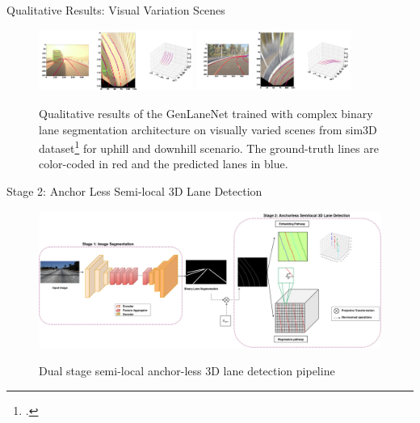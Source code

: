 \documentclass[aspectratio=169]{beamer}
\begin{document}
\begin{frame}{Qualitative Results: Visual Variation Scenes}
    \begin{figure}[h]
      \caption{Qualitative results of the  GenLaneNet trained with complex binary lane segmentation architecture on visually varied scenes from sim3D dataset\footcite{guo2020gen} for uphill and downhill scenario. The ground-truth lines are color-coded in red and the predicted lanes in blue.}
        \centering
        \includegraphics[width= 0.45\textwidth]{images/uphill_illus.png} 
        \hfill
        \includegraphics[width= 0.45\textwidth]{images/downhill_illus.png}
        \end{figure}
\end{frame}


\begin{frame}{Stage 2: Anchor Less Semi-local 3D Lane Detection}
     \begin{figure}[H]
     \centering
     
\includegraphics[width=0.8\linewidth, height=4.5cm]{images/3DlaneAUXNet.png} 
\label{fig:subim1}

\caption{Dual stage semi-local anchor-less 3D lane detection pipeline }
\label{fig:image2}
\end{figure}
\end{frame}
\end{document}
